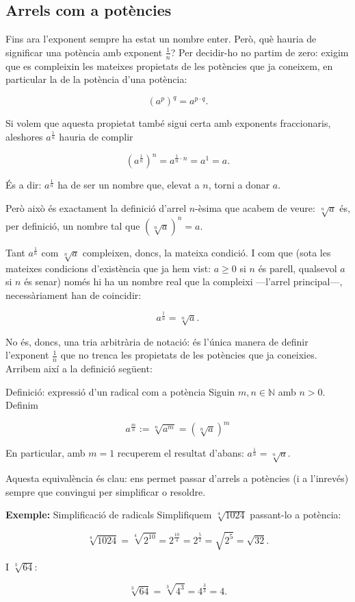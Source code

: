 \subsection{Arrels com a potències}

Fins ara l'exponent sempre ha estat un nombre enter. Però, què hauria de significar una potència amb exponent $\tfrac1n$? Per decidir-ho no partim de zero: exigim que es compleixin les mateixes propietats de les potències que ja coneixem, en particular la de la potència d'una potència:

\[
\left(a^p\right)^q = a^{p\cdot q}.
\]

Si volem que aquesta propietat també sigui certa amb exponents fraccionaris, aleshores $a^{\tfrac1n}$ hauria de complir

\[
\left(a^{\tfrac1n}\right)^n = a^{\tfrac1n \cdot n} = a^1 = a.
\]

És a dir: $a^{\tfrac1n}$ ha de ser un nombre que, elevat a $n$, torni a donar $a$.

Però això és exactament la definició d'arrel $n$-èsima que acabem de veure: $\sqrt[n]{a}$ és, per definició, un nombre tal que $\left(\sqrt[n]{a}\right)^n=a$.

Tant $a^{\tfrac1n}$ com $\sqrt[n]{a}$ compleixen, doncs, la mateixa condició. I com que (sota les mateixes condicions d'existència que ja hem vist: $a\geq0$ si $n$ és parell, qualsevol $a$ si $n$ és senar) només hi ha un nombre real que la compleixi —l'arrel principal—, necessàriament han de coincidir:

\[
a^{\tfrac1n} = \sqrt[n]{a}.
\]

No és, doncs, una tria arbitrària de notació: és l'única manera de definir l'exponent $\tfrac1n$ que no trenca les propietats de les potències que ja coneixies. Arribem així a la definició següent:

\begin{definicio}{Definició: expressió d'un radical com a potència}
Siguin $m,n \in \mathbb{N}$ amb $n>0$. Definim

\[
a^{\tfrac{m}{n}} := \sqrt[n]{a^m} = \left(\sqrt[n]{a}\right)^m
\]

En particular, amb $m=1$ recuperem el resultat d'abans: $a^{\tfrac{1}{n}} = \sqrt[n]{a}$.
\end{definicio}

Aquesta equivalència és clau: ens permet passar d'arrels a potències (i a l'inrevés) sempre que convingui per simplificar o resoldre.

\begin{exemple}{\textbf{Exemple:} Simplificació de radicals}
Simplifiquem $\sqrt[4]{1024}$ passant-lo a potència:

\[
\sqrt[4]{1024}
= \sqrt[4]{2^{10}}
= 2^{\tfrac{10}{4}}
= 2^{\tfrac{5}{2}}
= \sqrt{2^{5}}
= \sqrt{32}.
\]

I $\sqrt[3]{64}$:

\[
\sqrt[3]{64}
= \sqrt[3]{4^{3}}
= 4^{\tfrac{3}{3}}
= 4.
\]
\end{exemple}

